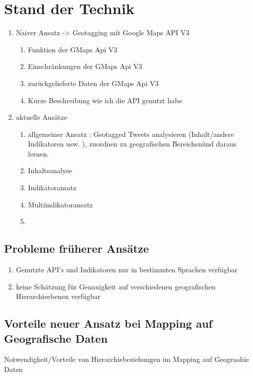 	\section{Stand der Technik}
		\begin{enumerate}
			\item Naiver Ansatz -> Geotagging mit Google Maps API V3
				\begin{enumerate}
					\item Funktion der GMaps Api V3
					\item Einschränkungen der GMaps Api V3
					\item zurückgelieferte Daten der GMaps Api V3
					\item Kurze Beschreibung wie ich die API genutzt habe
				\end{enumerate}
			\item aktuelle Ansätze
				\begin{enumerate}
					\item{ 
					allgemeiner Ansatz : Geotagged Tweets analysieren (Inhalt/andere Indikatoren usw. ), zuordnen zu geografischen \"Bereichen\" und daraus lernen.}
					\item{Inhaltsanalyse}
					\item{Indikatoransatz}
					\item{Multiindikatoransatz}
					\item

				\end{enumerate}
		\end{enumerate}

		\subsection{Probleme früherer Ansätze}
			\begin{enumerate}
				\item{Genutzte API's und Indikatoren nur in bestimmten Sprachen verfügbar}
				\item{keine Schätzung für Genauigkeit auf verschiedenen geografischen Hierarchieebenen verfügbar}  
			\end{enumerate}

		\subsection{Vorteile neuer Ansatz bei Mapping auf Geografische Daten}
		Notwendigkeit/Vorteile von Hierarchiebeziehungen im Mapping auf Geograohie Daten